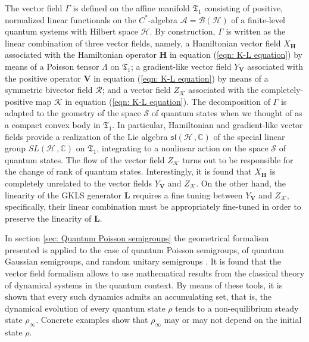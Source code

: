 \documentclass[11pt]{article}
\newcommand{\appa}{\mathcal{A}}
\newcommand{\stsp}{\mathcal{S}}
\begin{document}
The vector field $\Gamma$ is defined on the affine manifold $\mathfrak{T}_{1}$ consisting of positive, normalized linear functionals on the $C^{*}$-algebra $\appa=\mathcal{B}(\mathcal{H})$ of a finite-level quantum systems with Hilbert space $\mathcal{H}$.
By construction, $\Gamma$ is written as the linear combination of three vector fields, namely, a Hamiltonian vector field $X_{\mathbf{H}}$ associated with the Hamiltonian operator $\mathbf{H}$ in equation  (\ref{eqn: K-L equation}) by means of a Poisson tensor $\Lambda$ on $\mathfrak{T}_{1}$; a gradient-like vector field $Y_{\mathbf{V}}$ associated with the positive operator $\mathbf{V}$ in equation  (\ref{eqn: K-L equation}) by means of a symmetric bivector field $\mathcal{R}$; and a vector field $Z_{\mathcal{K}}$ associated with the completely-positive map $\mathcal{K}$ in equation  (\ref{eqn: K-L equation}).
The decomposition of $\Gamma$ is adapted to the geometry of the space $\stsp$ of quantum states when we thought of as a compact convex body in $\mathfrak{T}_{1}$.
In particular, Hamiltonian and gradient-like vector fields provide a realization of the Lie algebra $\mathfrak{sl}(\mathcal{H}\,,\mathbb{C})$ of the special linear group $SL(\mathcal{H}\,,\mathbb{C})$ on $\mathfrak{T}_{1}$, integrating to a nonlinear  action on the space $\stsp$ of quantum states.
The flow of the vector field $Z_{\mathcal{K}}$ turns out to be responsible for the change of rank of quantum states.
Interestingly, it is found that $X_{\mathbf{H}}$ is completely unrelated to the vector fields $Y_{\mathbf{V}}$ and $Z_{\mathcal{K}}$.
On the other hand, the linearity of the GKLS generator $\mathbf{L}$ requires a fine tuning between $Y_{\mathbf{V}}$ and $Z_{\mathcal{K}}$, specifically, their linear combination must be appropriately fine-tuned in order to preserve the linearity of $\mathbf{L}$.

In section \ref{sec: Quantum Poisson semigroups} the geometrical formalism presented is applied to the case of  quantum Poisson semigroups, of quantum Gaussian semigroups,
 and random unitary semigroups \cite{lindblad-on_the_generators_of_quantum_dynamical_semigroups,kossakowski-on_quantum_statistical_mechanics_of_non_hamiltonian_systems,aniello_kossakowski_marmo_ventriglia-quantum_brownian_motion_on_lie_groups_and_open_quantum_systems}.
 It is found that the vector field formalism allows to use mathematical results from the classical theory of dynamical systems in the quantum context.
By means of these tools, it is shown that every such dynamics admits an accumulating set, that is, the dynamical evolution of every quantum state $\rho$ tends to a non-equilibrium steady state $\rho_{\infty}$.
Concrete examples show that $\rho_{\infty}$ may or may not depend on the initial state $\rho$. 
\end{document}
